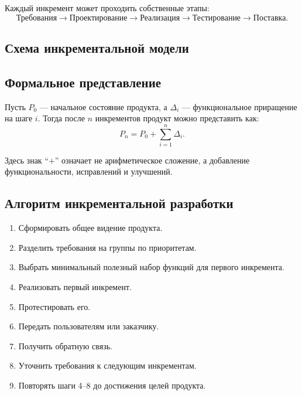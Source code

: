 \documentclass[12pt,a4paper]{article}
\begin{document}
Каждый инкремент может проходить собственные этапы:
\[
\text{Требования}
\rightarrow
\text{Проектирование}
\rightarrow
\text{Реализация}
\rightarrow
\text{Тестирование}
\rightarrow
\text{Поставка}.
\]

\subsection{Схема инкрементальной модели}

\begin{center}
\end{center}

\subsection{Формальное представление}

Пусть $P_0$ --- начальное состояние продукта, а $\Delta_i$ --- функциональное приращение на шаге $i$. Тогда после $n$ инкрементов продукт можно представить как:
\[
P_n = P_0 + \sum_{i=1}^{n} \Delta_i.
\]

Здесь знак ``$+$'' означает не арифметическое сложение, а добавление функциональности, исправлений и улучшений.

\subsection{Алгоритм инкрементальной разработки}

\begin{enumerate}
    \item Сформировать общее видение продукта.
    \item Разделить требования на группы по приоритетам.
    \item Выбрать минимальный полезный набор функций для первого инкремента.
    \item Реализовать первый инкремент.
    \item Протестировать его.
    \item Передать пользователям или заказчику.
    \item Получить обратную связь.
    \item Уточнить требования к следующим инкрементам.
    \item Повторять шаги 4--8 до достижения целей продукта.
\end{enumerate}
\end{document}
